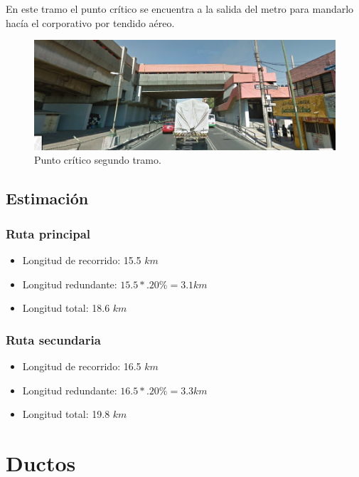 \documentclass[12pt,letterpaper]{article}
\begin{document}
En este tramo el punto crítico se encuentra a la salida del metro 
para mandarlo hacía el corporativo por tendido aéreo.
\begin{figure}[ht]
    \centering
    \includegraphics[width=.9\textwidth]{f10.png}
    \caption{Punto crítico segundo tramo.}
\end{figure}

\newpage
\subsection{Estimación}
\subsubsection{Ruta principal}
\begin{itemize}
    \item Longitud de recorrido: 15.5 $km$
    \item Longitud redundante: $15.5*.20\%=3.1km$
    \item Longitud total: 18.6 $km$
\end{itemize}

\subsubsection{Ruta secundaria}
\begin{itemize}
    \item Longitud de recorrido: 16.5 $km$
    \item Longitud redundante: $16.5*.20\%=3.3km$
    \item Longitud total: 19.8 $km$ 
\end{itemize}

\newpage
\section{Ductos}
\end{document}
